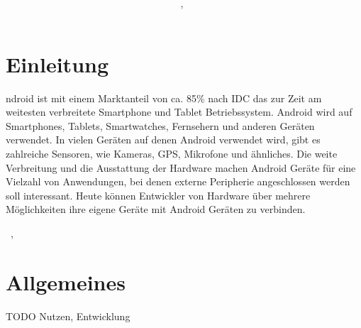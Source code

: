 \documentclass[12pt,journal,compsoc]{IEEEtran}
\begin{document}
\title{\paperTitle \\ \paperSubTitle }
\author{\paperAuthor,~}%



\maketitle

\section{Einleitung}


ndroid ist mit einem Marktanteil von ca. 85\% nach IDC das zur Zeit am weitesten verbreitete Smartphone und Tablet Betriebssystem.\cite{marketshare}
Android wird auf Smartphones, Tablets, Smartwatches, Fernsehern und anderen Geräten verwendet.
In vielen Geräten auf denen Android verwendet wird, gibt es zahlreiche Sensoren, wie Kameras, GPS, Mikrofone und ähnliches.
Die weite Verbreitung und die Ausstattung der Hardware machen Android Geräte für eine Vielzahl von Anwendungen, bei denen externe Peripherie angeschlossen werden soll interessant.
Heute können Entwickler von Hardware über mehrere Möglichkeiten ihre eigene Geräte mit Android Geräten zu verbinden.


\hfill{\the\day~\Monat, \the\year  }

\section{Allgemeines}
TODO Nutzen, Entwicklung
\end{document}
